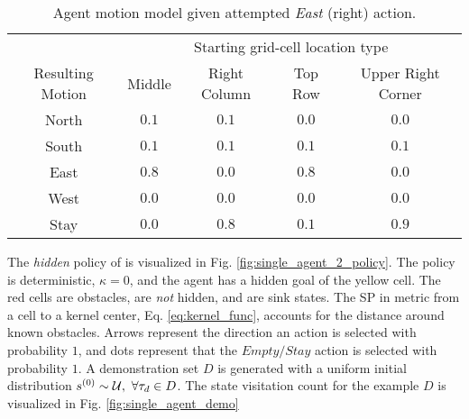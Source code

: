     \begin{table}[h!]
        \centering
        \begin{tabular}{ c || c | c | c | c}
                & \multicolumn{4}{c}{Starting grid-cell location type}\\
                Resulting Motion & Middle & Right Column & Top Row & Upper Right Corner\\
                \hline
                North & $0.1$ & $0.1$ & $0.0$ & $0.0$ \\
                South & $0.1$ & $0.1$ & $0.1$ & $0.1$ \\
                East  & $0.8$ & $0.0$ & $0.8$ & $0.0$ \\
                West  & $0.0$ & $0.0$ & $0.0$ & $0.0$ \\
                Stay  & $0.0$ & $0.8$ & $0.1$ & $0.9$ \\
        \end{tabular}
        \label{table:motion_model}
        \caption{Agent motion model given attempted \textit{East} (right) action.}
    \end{table}

    The \textit{hidden} policy of  is visualized in Fig. \ref{fig:single_agent_2_policy}. The policy is
    deterministic, $\kappa=0$, and the agent has a hidden goal of the yellow cell. The red cells are obstacles, are
    \textit{not} hidden, and are sink states. The \acf{SP} in metric from a cell to a kernel center, Eq. \ref{eq:kernel_func}, accounts for the distance around known obstacles. Arrows represent the direction an action is selected with probability $1$,
    and dots represent that the $Empty/Stay$ action is selected with probability $1$. A demonstration set $D$ is
    generated with a uniform initial distribution $s^{(0)} \sim \mathcal{U},\ \forall \tau_d \in D$. The state
    visitation count for the example $D$ is visualized in Fig. \ref{fig:single_agent_demo}

    \begin{figure}[htb]
        \begin{center}
        \end{center}
    \end{figure}


